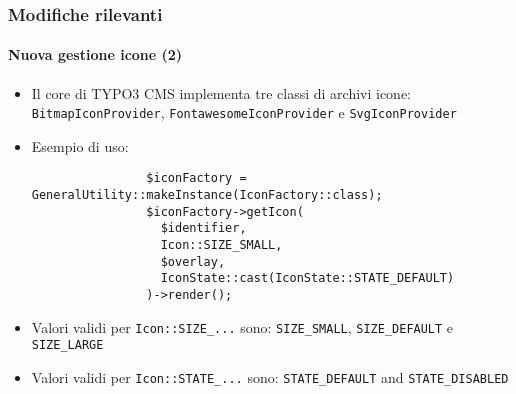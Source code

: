 \begin{frame}[fragile]
	\frametitle{Modifiche rilevanti}
	\framesubtitle{Nuova gestione icone (2)}

	\lstset{basicstyle=\tiny\ttfamily}

	\begin{itemize}

		\item Il core di TYPO3 CMS implementa tre classi di archivi icone:\newline
			\smaller
				\texttt{BitmapIconProvider}, \texttt{FontawesomeIconProvider} e \texttt{SvgIconProvider}
			\normalsize

		\item Esempio di uso:

			\begin{lstlisting}
				$iconFactory = GeneralUtility::makeInstance(IconFactory::class);
				$iconFactory->getIcon(
				  $identifier,
				  Icon::SIZE_SMALL,
				  $overlay,
				  IconState::cast(IconState::STATE_DEFAULT)
				)->render();
			\end{lstlisting}

		\item Valori validi per \texttt{Icon::SIZE\_...} sono:\newline
			\small\texttt{SIZE\_SMALL}, \texttt{SIZE\_DEFAULT} e \texttt{SIZE\_LARGE}\normalsize
			\vspace{0.4cm}

		\item Valori validi per \texttt{Icon::STATE\_...} sono:\newline
			\small\texttt{STATE\_DEFAULT} and \texttt{STATE\_DISABLED}\normalsize

	\end{itemize}

\end{frame}


